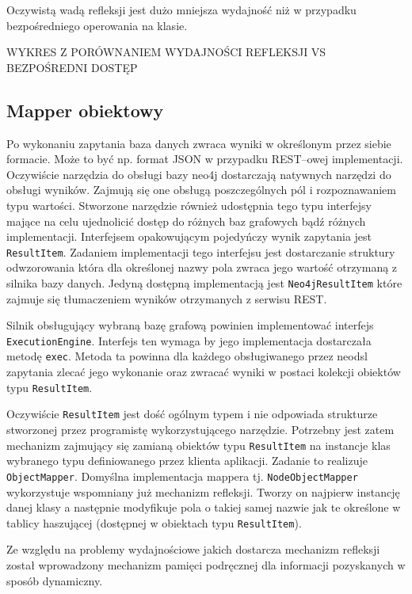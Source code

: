 \documentclass[brudnopis]{xmgr}
\begin{document}
Oczywistą wadą refleksji jest dużo mniejsza wydajność niż w przypadku bezpośredniego operowania na klasie.

WYKRES Z PORÓWNANIEM WYDAJNOŚCI REFLEKSJI VS BEZPOŚREDNI DOSTĘP

\subsection{Mapper obiektowy}

Po wykonaniu zapytania baza danych zwraca wyniki w określonym przez siebie formacie. Może to być np. format JSON w przypadku REST--owej implementacji. Oczywiście narzędzia do obsługi bazy neo4j dostarczają natywnych narzędzi do obsługi wyników. Zajmują się one obsługą poszczególnych pól i rozpoznawaniem typu wartości. Stworzone narzędzie również udostępnia tego typu interfejsy mające na celu ujednolicić dostęp do różnych baz grafowych bądź różnych implementacji. Interfejsem opakowującym pojedyńczy wynik zapytania jest \texttt{ResultItem}. Zadaniem implementacji tego interfejsu jest dostarczanie struktury odwzorowania która dla określonej nazwy pola zwraca jego wartość otrzymaną z silnika bazy danych. Jedyną dostępną implementacją jest \texttt{Neo4jResultItem} które zajmuje się tłumaczeniem wyników otrzymanych z serwisu REST.

Silnik obsługujący wybraną bazę grafową powinien implementować interfejs \texttt{ExecutionEngine}. Interfejs ten wymaga by jego implementacja dostarczała metodę \texttt{exec}. Metoda ta powinna dla każdego obsługiwanego przez neodsl zapytania zlecać jego wykonanie oraz zwracać wyniki w postaci kolekcji obiektów typu \texttt{ResultItem}.

Oczywiście \texttt{ResultItem} jest dość ogólnym typem i nie odpowiada strukturze stworzonej przez programistę wykorzystującego narzędzie. Potrzebny jest zatem mechanizm zajmujący się zamianą obiektów typu \texttt{ResultItem} na instancje klas wybranego typu definiowanego przez klienta aplikacji. Zadanie to realizuje \texttt{ObjectMapper}. Domyślna implementacja mappera tj. \texttt{NodeObjectMapper} wykorzystuje wspomniany już mechanizm refleksji. Tworzy on najpierw instancję danej klasy a następnie modyfikuje pola o takiej samej nazwie jak te określone w tablicy haszującej (dostępnej w obiektach typu \texttt{ResultItem}).

Ze względu na problemy wydajnościowe jakich dostarcza mechanizm refleksji został wprowadzony mechanizm pamięci podręcznej dla informacji pozyskanych w sposób dynamiczny.
\end{document}
